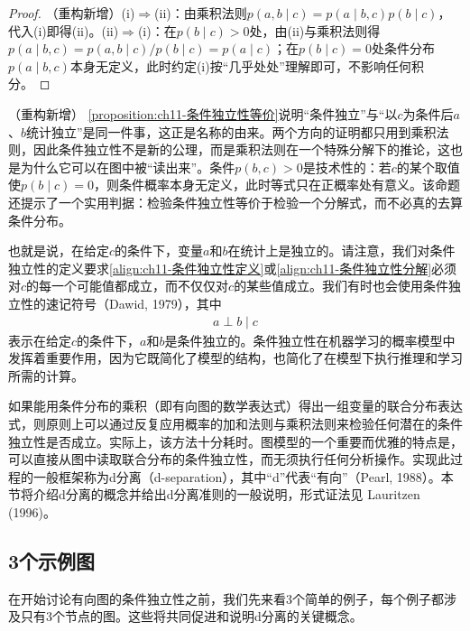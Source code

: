 \documentclass[../../main.tex]{subfiles}
\begin{document}
\begin{proof}
（重构新增）(i)$\Rightarrow$(ii)：由乘积法则$p(a,b\mid c)=p(a\mid b,c)p(b\mid c)$，代入(i)即得(ii)。(ii)$\Rightarrow$(i)：在$p(b\mid c)>0$处，由(ii)与乘积法则得$p(a\mid b,c)=p(a,b\mid c)/p(b\mid c)=p(a\mid c)$；在$p(b\mid c)=0$处条件分布$p(a\mid b,c)$本身无定义，此时约定(i)按“几乎处处”理解即可，不影响任何积分。
\end{proof}

\begin{remark}（重构新增）
\cref{proposition:ch11-条件独立性等价}说明“条件独立”与“以$c$为条件后$a$、$b$统计独立”是同一件事，这正是名称的由来。两个方向的证明都只用到乘积法则，因此条件独立性不是新的公理，而是乘积法则在一个特殊分解下的推论，这也是为什么它可以在图中被“读出来”。条件$p(b,c)>0$是技术性的：若$c$的某个取值使$p(b\mid c)=0$，则条件概率本身无定义，此时等式只在正概率处有意义。该命题还提示了一个实用判据：检验条件独立性等价于检验一个分解式，而不必真的去算条件分布。
\end{remark}

也就是说，在给定$c$的条件下，变量$a$和$b$在统计上是独立的。请注意，我们对条件独立性的定义要求\eqref{align:ch11-条件独立性定义}或\eqref{align:ch11-条件独立性分解}必须对$c$的每一个可能值都成立，而不仅仅对$c$的某些值成立。我们有时也会使用条件独立性的速记符号（Dawid, 1979），其中
\begin{align}
  a \perp b \mid c
  \label{align:ch11-条件独立性记号}
\end{align}
表示在给定$c$的条件下，$a$和$b$是条件独立的。条件独立性在机器学习的概率模型中发挥着重要作用，因为它既简化了模型的结构，也简化了在模型下执行推理和学习所需的计算。

如果能用条件分布的乘积（即有向图的数学表达式）得出一组变量的联合分布表达式，则原则上可以通过反复应用概率的加和法则与乘积法则来检验任何潜在的条件独立性是否成立。实际上，该方法十分耗时。图模型的一个重要而优雅的特点是，可以直接从图中读取联合分布的条件独立性，而无须执行任何分析操作。实现此过程的一般框架称为d分离（d-separation），其中“d”代表“有向”（Pearl, 1988）。本节将介绍d分离的概念并给出d分离准则的一般说明，形式证法见 Lauritzen (1996)。

\subsection{3个示例图}\label{subsection:ch11-3个示例图}

在开始讨论有向图的条件独立性之前，我们先来看3个简单的例子，每个例子都涉及只有3个节点的图。这些将共同促进和说明d分离的关键概念。
\end{document}

